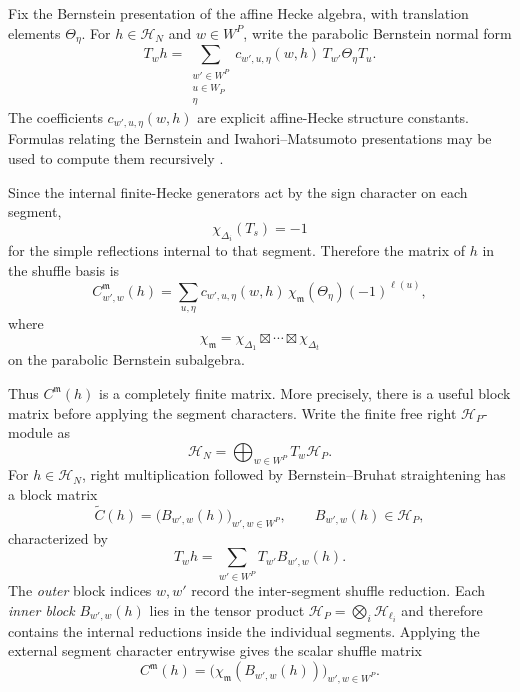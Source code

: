 \documentclass[12pt]{article}
\theoremstyle{definition}
\theoremstyle{remark}
\begin{document}
Fix the Bernstein presentation of the affine Hecke algebra, with translation
elements \(\Theta_\eta\).  For \(h\in\mathcal H_N\) and \(w\in W^P\), write
the parabolic Bernstein normal form
\begin{equation}\label{eq:parabolic-Bernstein-normal-form}
 T_wh
 =
 \sum_{\substack{w'\in W^P\\u\in W_P\\\eta}}
 c_{w',u,\eta}(w,h)\,
 T_{w'}\Theta_\eta T_u.
\end{equation}
The coefficients \(c_{w',u,\eta}(w,h)\) are explicit affine-Hecke structure
constants.  Formulas relating the Bernstein and Iwahori--Matsumoto
presentations may be used to compute them recursively
\cite{HainesPettet2002}.

Since the internal finite-Hecke generators act by the sign character on each
segment,
\[
 \chi_{\Delta_i}(T_s)=-1
\]
for the simple reflections internal to that segment.  Therefore the matrix
of \(h\) in the shuffle basis is
\begin{equation}\label{eq:finite-shuffle-matrix}
 C^{\mathfrak m}_{w',w}(h)
 =
 \sum_{u,\eta}
 c_{w',u,\eta}(w,h)\,
 \chi_{\mathfrak m}(\Theta_\eta)
 (-1)^{\ell(u)},
\end{equation}
where
\[
 \chi_{\mathfrak m}
 =
 \chi_{\Delta_1}\boxtimes\cdots\boxtimes\chi_{\Delta_t}
\]
on the parabolic Bernstein subalgebra.

Thus $C^{\mathfrak m}(h)$ is a completely finite matrix.  More
precisely, there is a useful block matrix before applying the segment
characters.  Write the finite free right $\mathcal H_P$-module as
\[
 \mathcal H_N
 =\bigoplus_{w\in W^P}T_w\mathcal H_P.
\]
For $h\in\mathcal H_N$, right multiplication followed by Bernstein--Bruhat
straightening has a block matrix
\begin{equation}\label{eq:pre-specialization-block-matrix}
 \widetilde C(h)
 =\bigl(B_{w',w}(h)\bigr)_{w',w\in W^P},
 \qquad
 B_{w',w}(h)\in\mathcal H_P,
\end{equation}
characterized by
\[
 T_wh=\sum_{w'\in W^P}T_{w'}B_{w',w}(h).
\]
The \emph{outer} block indices $w,w'$ record the inter-segment shuffle
reduction.  Each \emph{inner block}
$B_{w',w}(h)$ lies in the tensor product
$\mathcal H_P=\bigotimes_i\mathcal H_{\ell_i}$ and therefore contains the
internal reductions inside the individual segments.  Applying the external
segment character entrywise gives the scalar shuffle matrix
\begin{equation}\label{eq:finite-shuffle-block-specialization}
 C^{\mathfrak m}(h)
 =\bigl(\chi_{\mathfrak m}(B_{w',w}(h))\bigr)_{w',w\in W^P}.
\end{equation}
\end{document}
